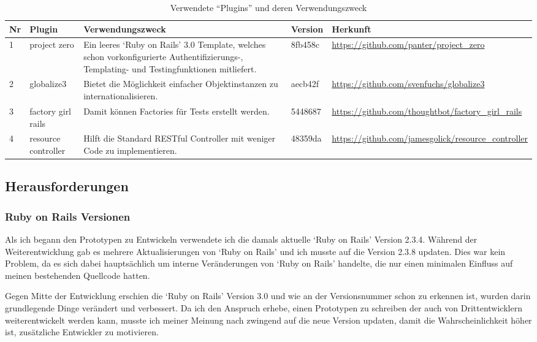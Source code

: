 \begin{table}[ht]
\begin{center}
    \begin{tabular}{llp{6cm}lp{3cm}}
        \toprule Nr & Plugin & Verwendungszweck & Version & Herkunft \\
        \midrule 1 & project zero & Ein leeres `Ruby on Rails' 3.0 Template, welches
                 schon vorkonfigurierte Authentifizierungs-, Templating- und Testingfunktionen
                 mitliefert. & 8fb458c & \url{https://github.com/panter/project_zero} \\
        \midrule 2 & globalize3 & Bietet die Möglichkeit einfacher Objektinstanzen
                 zu internationalisieren. & aecb42f & \url{https://github.com/svenfuchs/globalize3} \\
        \midrule 3 & factory girl rails & Damit können Factories \cite{factory} für Tests
                 erstellt werden. & 5448687 & \url{https://github.com/thoughtbot/factory_girl_rails} \\
        \midrule 4 & resource controller & Hilft die Standard RESTful \cite{restful} Controller mit weniger Code
                 zu implementieren. & 48359da & \url{https://github.com/jamesgolick/resource_controller} \\
        \bottomrule
    \end{tabular}
    \caption{Verwendete ``Plugins'' und deren Verwendungszweck}
    \label{tab:plugins}
\end{center}
\end{table}

\clearpage

\subsection{Herausforderungen}
\subsubsection{Ruby on Rails Versionen}
Als ich begann den Prototypen zu Entwickeln verwendete ich die damals aktuelle
`Ruby on Rails' Version 2.3.4. Während der Weiterentwicklung gab es mehrere
Aktualisierungen von `Ruby on Rails' und ich musste auf die Version 2.3.8
updaten. Dies war kein Problem, da es sich dabei hauptsächlich um interne
Veränderungen von `Ruby on Rails' handelte, die nur einen minimalen Einfluss 
auf meinen bestehenden Quellcode hatten.

Gegen Mitte der Entwicklung erschien die `Ruby on Rails' Version 3.0 und wie
an der Versionsnummer schon zu erkennen ist, wurden darin grundlegende Dinge
verändert und verbessert. Da ich den Anspruch erhebe, einen Prototypen zu schreiben
der auch von Drittentwicklern weiterentwickelt werden kann, musste ich meiner
Meinung nach zwingend auf die neue Version updaten, damit die Wahrscheinlichkeit
höher ist, zusätzliche Entwickler zu motivieren.

